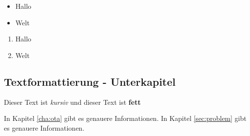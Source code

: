 \begin{itemize}
    \item Hallo
    \item Welt
\end{itemize}

\begin{enumerate}
    \item Hallo
    \item Welt
\end{enumerate}

\subsection*{Textformattierung - Unterkapitel}
    Dieser Text ist \textit{kursiv} und dieser Text ist \textbf{fett}

    In Kapitel \ref{cha:ota} gibt es genauere Informationen.
    \newline
    In Kapitel \ref{sec:problem} gibt es genauere Informationen.